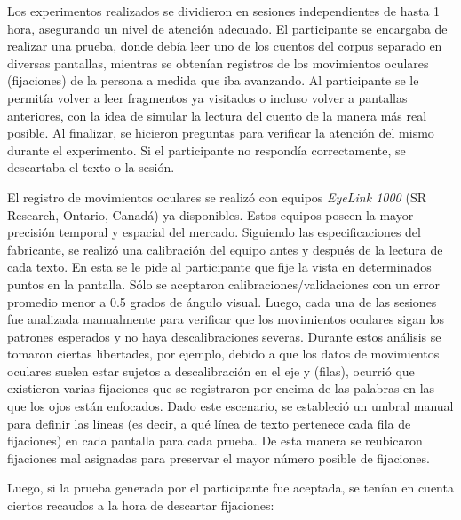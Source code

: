 Los experimentos realizados se dividieron en sesiones independientes de hasta 1 hora, asegurando un nivel de atención adecuado. El participante se encargaba de realizar una prueba, donde debía leer uno de los cuentos del corpus separado en diversas pantallas, mientras se obtenían registros de los movimientos oculares (fijaciones) de la persona a medida que iba avanzando. Al participante se le permitía volver a leer fragmentos ya visitados o incluso volver a pantallas anteriores, con la idea de simular la lectura del cuento de la manera más real posible. Al finalizar, se hicieron preguntas para verificar la atención del mismo durante el experimento. Si el participante no respondía correctamente, se descartaba el texto o la sesión.

El registro de movimientos oculares se realizó con equipos \textit{EyeLink 1000} (SR Research, Ontario, Canadá) ya disponibles. Estos equipos poseen la mayor precisión temporal y espacial del mercado. Siguiendo las especificaciones del fabricante, se realizó una calibración del equipo antes y después de la lectura de cada texto. En esta se le pide al participante que fije la vista en determinados puntos en la pantalla. Sólo se aceptaron calibraciones/validaciones con un error promedio menor a 0.5 grados de ángulo visual. Luego, cada una de las sesiones fue analizada manualmente para verificar que los movimientos oculares sigan los patrones esperados y no haya descalibraciones severas. Durante estos análisis se tomaron ciertas libertades, por ejemplo, debido a que los datos de movimientos oculares suelen estar sujetos a descalibración en el eje y (filas), ocurrió que existieron varias fijaciones que se registraron por encima de las palabras en las que los ojos están enfocados. Dado este escenario, se estableció un umbral manual para definir las líneas (es decir, a qué línea de texto pertenece cada fila de fijaciones) en cada pantalla para cada prueba. De esta manera se reubicaron fijaciones mal asignadas para preservar el mayor número posible de fijaciones.

Luego, si la prueba generada por el participante fue aceptada, se tenían en cuenta ciertos recaudos a la hora de descartar fijaciones:

